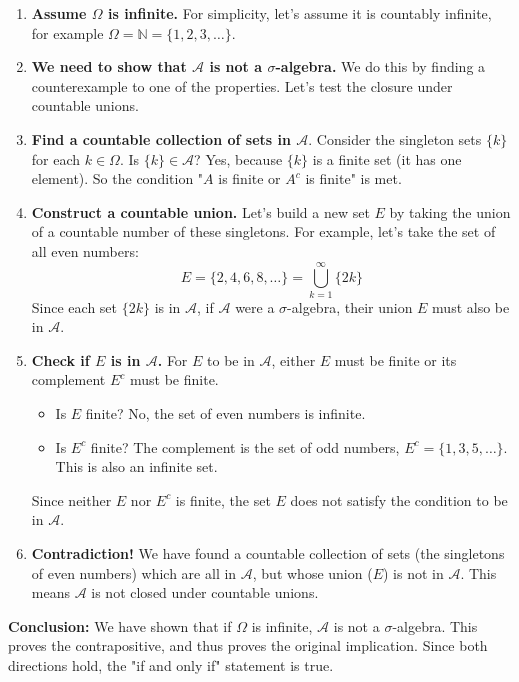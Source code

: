 \documentclass[11pt,a4paper]{article}
\begin{document}
\begin{enumerate}
    \item \textbf{Assume $\Omega$ is infinite.} For simplicity, let's assume it is countably infinite, for example $\Omega = \mathbb{N} = \{1, 2, 3, \ldots\}$.

    \item \textbf{We need to show that $\mathcal{A}$ is not a $\sigma$-algebra.} We do this by finding a counterexample to one of the properties. Let's test the closure under countable unions.

    \item \textbf{Find a countable collection of sets in $\mathcal{A}$}. Consider the singleton sets $\{k\}$ for each $k \in \Omega$.
    Is $\{k\} \in \mathcal{A}$? Yes, because $\{k\}$ is a finite set (it has one element). So the condition "$A$ is finite or $A^c$ is finite" is met.

    \item \textbf{Construct a countable union.} Let's build a new set $E$ by taking the union of a countable number of these singletons. For example, let's take the set of all even numbers:
    \[ E = \{2, 4, 6, 8, \ldots\} = \bigcup_{k=1}^{\infty} \{2k\} \]
    Since each set $\{2k\}$ is in $\mathcal{A}$, if $\mathcal{A}$ were a $\sigma$-algebra, their union $E$ must also be in $\mathcal{A}$.

    \item \textbf{Check if $E$ is in $\mathcal{A}$.} For $E$ to be in $\mathcal{A}$, either $E$ must be finite or its complement $E^c$ must be finite.
    \begin{itemize}
        \item Is $E$ finite? No, the set of even numbers is infinite.
        \item Is $E^c$ finite? The complement is the set of odd numbers, $E^c = \{1, 3, 5, \ldots\}$. This is also an infinite set.
    \end{itemize}
    Since neither $E$ nor $E^c$ is finite, the set $E$ does not satisfy the condition to be in $\mathcal{A}$.

    \item \textbf{Contradiction!} We have found a countable collection of sets (the singletons of even numbers) which are all in $\mathcal{A}$, but whose union ($E$) is not in $\mathcal{A}$. This means $\mathcal{A}$ is not closed under countable unions.
\end{enumerate}

\textbf{Conclusion:} We have shown that if $\Omega$ is infinite, $\mathcal{A}$ is not a $\sigma$-algebra. This proves the contrapositive, and thus proves the original implication. Since both directions hold, the "if and only if" statement is true.
\end{document}
